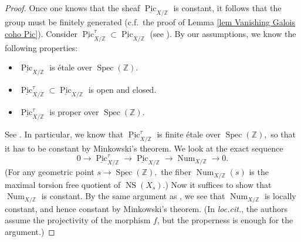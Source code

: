 \documentclass{amsart}
\theoremstyle{definition}
\theoremstyle{remark}
\DeclareMathOperator{\Spec}{Spec}
\DeclareMathOperator{\Pic}{Pic}
\DeclareMathOperator{\NS}{NS}
\DeclareMathOperator{\Num}{Num}
\newcommand{\ZZ}{\mathbb Z}
\begin{document}
\begin{proof}
Once one knows that the sheaf $\underline{\Pic}_{X/\ZZ}$ is constant, it follows that the group must be finitely generated (c.f.\ the proof of Lemma \ref{lem Vanishing Galois coho Pic}).
Consider $\underline{\Pic}^{\tau}_{X/\ZZ}\subset \underline{\Pic}_{X/\ZZ}$ (see \cite[Section 3]{fringuelli2023picardgroupschememoduli}).
By our assumptions, we know the following properties:
\begin{itemize}
    \item $\underline{\Pic}_{X/\ZZ}$ is \'etale over $\Spec(\ZZ)$.
    \item $\underline{\Pic}^{\tau}_{X/\ZZ}\subset \underline{\Pic}_{X/\ZZ}$ is open and closed.
    \item $\underline{\Pic}^{\tau}_{X/\ZZ}$ is proper over $\Spec(\ZZ)$.
\end{itemize}
See \cite[Proposition 3.2, Theorem 3.6]{fringuelli2023picardgroupschememoduli}.
In particular, we know that $\underline{\Pic}^{\tau}_{X/\ZZ}$ is finite étale over $\Spec(\ZZ),$ so that it has to be constant by Minkowski's theorem.
We look at the exact sequence
\[
0 \to \underline{\Pic}_{X/\ZZ}^{\tau} \to \underline{\Pic}_{X/\ZZ} \to \Num_{X/\ZZ} \to 0.
\]
(For any geometric point $s \rightarrow \Spec(\ZZ),$
the fiber
$
\Num_{X/\ZZ}(s)
$
is the 
maximal torsion free quotient of
$\NS(X_{s})$.)
Now it suffices to show that $\Num_{X/\ZZ}$ is constant.
By the same argument as \cite[Proposition 4.2]{ekedahl2012moduliperiodssimplyconnected}, we see that $\Num_{X/\ZZ}$ is locally constant, and hence constant by Minkowski's theorem.
(In \textit{loc.cit.}, the authors assume the projectivity of the morphism $f$, but the properness is enough for the argument.)
\end{proof}
\end{document}
